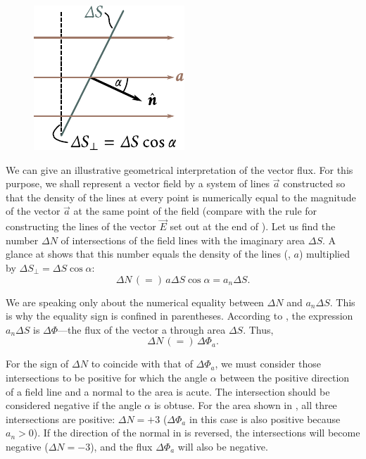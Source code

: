 \begin{figure}[t]
	\begin{center}
		\includegraphics[scale=0.95]{figures/ch_01/fig_1_20.pdf}
		\caption[]{}
		\label{fig:1_20}
	\end{center}
	\vspace{-1.0cm}
\end{figure}

We can give an illustrative geometrical interpretation of the vector flux. For this purpose, we shall represent a vector field by a system of
lines $\vec{a}$ constructed so that the density of the lines at every point is numerically equal to the magnitude of the vector $\vec{a}$ at the same point of the field (compare with the rule for constructing the lines of the vector $\vec{E}$ set out at the end of ). Let us find the number $\Delta{N}$ of intersections of the field lines with the imaginary area $\Delta{S}$. A glance at  shows that this number equals the density of the lines (\ie, $a$) multiplied by $\Delta{S}_{\perp}=\Delta{S}\cos\alpha$:
\begin{equation*}
	\Delta{N}\, (=)\, a \Delta{S}\cos\alpha = a_n \Delta{S}.
\end{equation*}

\noindent
We are speaking only about the numerical equality between $\Delta{N}$ and $a_n\Delta{S}$. This is why the equality sign is confined in parentheses. According to , the expression $a_n\Delta{S}$ is $\Delta{\Phi}$---the flux of the vector a through area $\Delta{S}$. Thus,
\begin{equation}\label{eq:1_75}
	\Delta{N}\, (=)\, \Delta{\Phi}_a.
\end{equation}

For the sign of $\Delta{N}$ to coincide with that of $\Delta{\Phi}_a$, we must consider those intersections to be positive for which the angle $\alpha$ between the positive direction of a field line and a normal to the area is acute. The intersection should be considered negative if the angle $\alpha$ is obtuse. For the area shown in , all three intersections are positive: $\Delta{N}=+3$ ($\Delta{\Phi}_a$ in this case is also positive because $a_n>0$). If the direction of the normal in  is reversed, the intersections will become negative ($\Delta{N}=-3$), and the flux $\Delta{\Phi}_a$ will also be negative.


